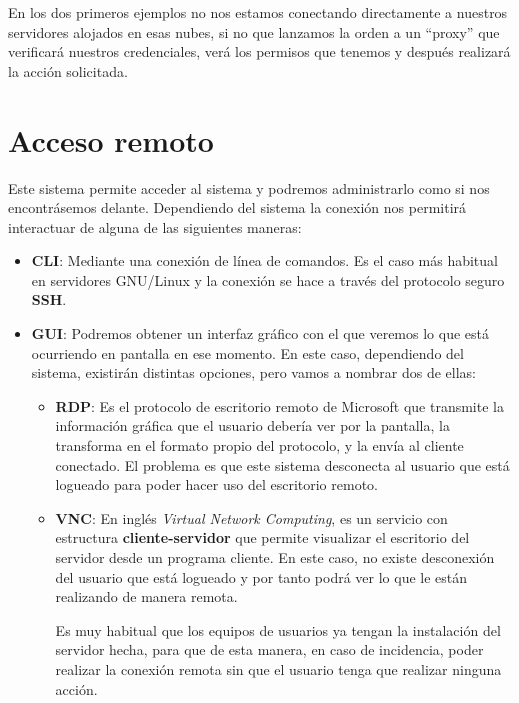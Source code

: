 En los dos primeros ejemplos no nos estamos conectando directamente a nuestros servidores alojados en esas nubes, si no que lanzamos la orden a un “proxy” que verificará nuestros credenciales, verá los permisos que tenemos y después realizará la acción solicitada.


%
%
%
%
%
%


\section{Acceso remoto}
Este sistema permite acceder al sistema y podremos administrarlo como si nos encontrásemos delante. Dependiendo del sistema la conexión nos permitirá interactuar de alguna de las siguientes maneras:

\begin{itemize}
    \item \textbf{CLI}: Mediante una conexión de línea de comandos. Es el caso más habitual en servidores GNU/Linux y la conexión se hace a través del protocolo seguro \textbf{SSH}.

    \item \textbf{GUI}: Podremos obtener un interfaz gráfico con el que veremos lo que está ocurriendo en pantalla en ese momento. En este caso, dependiendo del sistema, existirán distintas opciones, pero vamos a nombrar dos de ellas:

    \begin{itemize}
        \item \textbf{RDP}: Es el protocolo de escritorio remoto de Microsoft que transmite la información gráfica que el usuario debería ver por la pantalla, la transforma en el formato propio del protocolo, y la envía al cliente conectado. El problema es que este sistema desconecta al usuario que está logueado para poder hacer uso del escritorio remoto.

        \item \textbf{VNC}: En inglés \textit{Virtual Network Computing}, es un servicio con estructura \textbf{cliente-servidor} que permite visualizar el escritorio del servidor desde un programa cliente. En este caso, no existe desconexión del usuario que está logueado y por tanto podrá ver lo que le están realizando de manera remota.

        Es muy habitual que los equipos de usuarios ya tengan la instalación del servidor hecha, para que de esta manera, en caso de incidencia, poder realizar la conexión remota sin que el usuario tenga que realizar ninguna acción.
    \end{itemize}
\end{itemize}




\clearpage